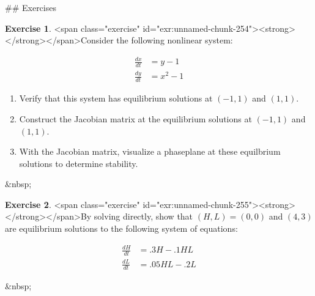 \documentclass[
]{book}
\theoremstyle{definition}
\theoremstyle{definition}
\theoremstyle{definition}
\newtheorem{exercise}{Exercise}[chapter]
\theoremstyle{remark}
\begin{document}
\newpage

## Exercises
\begin{exercise}
<span class="exercise" id="exr:unnamed-chunk-254"><strong>\label{exr:unnamed-chunk-254} </strong></span>Consider the following nonlinear system:

\begin{equation}
\begin{split} 
\frac{dx}{dt} &= y-1 \\ 
\frac{dy}{dt} &= x^{2}-1 
\end{split}
\end{equation}

\begin{enumerate}[label=\alph*.]
\item Verify that this system has equilibrium solutions at $(-1,1)$ and $(1,1)$.
\item Construct the Jacobian matrix at the equilibrium solutions at $(-1,1)$ and $(1,1)$.
\item With the Jacobian matrix, visualize a phaseplane at these equilbrium solutions to determine stability.
\end{enumerate}
\end{exercise}
&nbsp;

\begin{exercise}
<span class="exercise" id="exr:unnamed-chunk-255"><strong>\label{exr:unnamed-chunk-255} </strong></span>By solving directly, show that $(H,L)=(0,0)$ and $(4,3)$ are equilibrium solutions to the following system of equations:

\begin{equation}
\begin{split}
\frac{dH}{dt} &= .3 H - .1 HL \\
\frac{dL}{dt} &=.05HL -.2L
\end{split}
\end{equation}
\end{exercise}
&nbsp;
\end{document}
